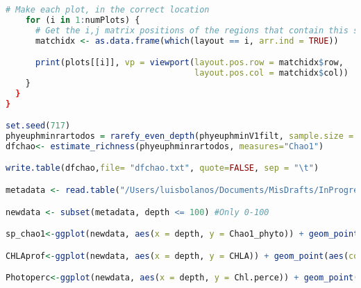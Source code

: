 \documentclass{article}
\begin{document}
\begin{lstlisting}[language=R,caption={N1N2figscripts}]
    # Make each plot, in the correct location
    for (i in 1:numPlots) {
      # Get the i,j matrix positions of the regions that contain this subplot
      matchidx <- as.data.frame(which(layout == i, arr.ind = TRUE))

      print(plots[[i]], vp = viewport(layout.pos.row = matchidx$row,
                                      layout.pos.col = matchidx$col))
    }
  }
}

set.seed(717)
phyeuphminrartodos = rarefy_even_depth(phyeuphminV1filt, sample.size = 1594)
dfchao<- estimate_richness(phyeuphminrartodos, measures="Chao1")

write.table(dfchao,file= "dfchao.txt", quote=FALSE, sep = "\t")

metadata <- read.table("/Users/luisbolanos/Documents/MisDrafts/InProgress/PhytoNAAMES/V5/Figures/seqtab-par_on16.photo1351_envdataV2.txt", header=T, row.names=1, sep="\t")

newdata <- subset(metadata, depth <= 100) #Only 0-100

sp_chao1<-ggplot(newdata, aes(x = depth, y = Chao1_phyto)) + geom_point(aes(color=statioNodef), size=2) + geom_line(aes(color=statioNodef), ) +scale_x_reverse() +scale_color_manual(values=c("darkcyan","darkblue","cyan2","chartreuse4","chartreuse3","chartreuse","darkolivegreen2","darkorange2","darkgoldenrod2","brown3")) + coord_flip()+ theme_bw() + facet_grid(rows = vars(Type))+ ylab("Species richness [Chao1]") + theme(strip.background = element_blank(),strip.text.x = element_blank(),axis.text.y=element_blank(), axis.text.x=element_text(size=16), text = element_text(size=18),strip.text = element_text(size=20),axis.title.y=element_blank(),legend.text=element_text(size=18))

CHLAprof<-ggplot(newdata, aes(x = depth, y = CHLA)) + geom_point(aes(color=statioNodef), size=2) + geom_line(aes(color=statioNodef)) +scale_x_reverse()+scale_color_manual(values=c("darkcyan","darkblue","cyan2","chartreuse4","chartreuse3","chartreuse","darkolivegreen2","darkorange2","darkgoldenrod2","brown3")) + coord_flip()+ theme_bw() + facet_grid(rows = vars(Type))+ ylab("Chlorophyll a [mg/m^3]")+ xlab("depth [m]")+ theme(strip.background = element_blank(), axis.text.x=element_text(size=16), text = element_text(size=18), strip.text.y = element_blank(),legend.position = "none")

Photoperc<-ggplot(newdata, aes(x = depth, y = Chl.perce)) + geom_point(aes(color=statioNodef), size=2) + geom_line(aes(color=statioNodef)) +scale_x_reverse()+scale_color_manual(values=c("darkcyan","darkblue","cyan2","chartreuse4","chartreuse3","chartreuse","darkolivegreen2","darkorange2","darkgoldenrod2","brown3")) + coord_flip()+ theme_bw() + facet_grid(rows = vars(Type)) + ylab("Phytoplankton sequences [%]")+xlab("depth [m]")+ theme(strip.background = element_blank(),strip.text.x = element_blank(),axis.text.y=element_blank(), axis.text.x=element_text(size=16), text = element_text(size=18),strip.text = element_text(size=20),strip.text.y = element_blank(),axis.title.y=element_blank(),legend.position = "none")


\end{lstlisting}
\end{document}
